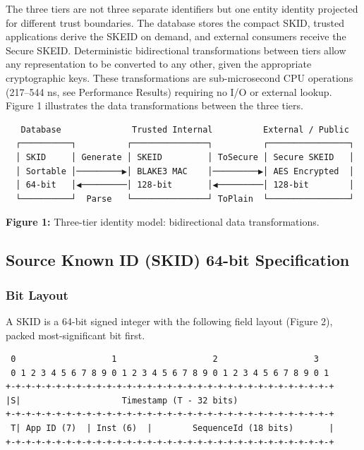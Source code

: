 \documentclass[fleqn,10pt]{wlpeerj}
\begin{document}
The three tiers are not three separate identifiers but one entity
identity projected for different trust boundaries. The database stores
the compact SKID, trusted applications derive the SKEID on demand, and
external consumers receive the Secure SKEID. Deterministic bidirectional
transformations between tiers allow any representation to be converted
to any other, given the appropriate cryptographic keys. These
transformations are sub-microsecond CPU operations (217--544 ns, see
Performance Results) requiring no I/O or external lookup. Figure 1
illustrates the data transformations between the three tiers.

\begin{verbatim}
   Database              Trusted Internal          External / Public
  ┌──────────┐          ┌───────────────┐          ┌────────────────┐
  │ SKID     │ Generate │ SKEID         │ ToSecure │ Secure SKEID   │
  │ Sortable │─────────▶│ BLAKE3 MAC    │─────────▶│ AES Encrypted  │
  │ 64-bit   │◀─────────│ 128-bit       │◀─────────│ 128-bit        │
  └──────────┘  Parse   └───────────────┘ ToPlain  └────────────────┘
\end{verbatim}

\textbf{Figure 1:} Three-tier identity model: bidirectional data
transformations.

\subsection{Source Known ID (SKID) 64-bit
Specification}\label{source-known-id-skid-64-bit-specification}

\subsubsection{Bit Layout}\label{bit-layout}

A SKID is a 64-bit signed integer with the following field layout
(Figure 2), packed most-significant bit first.

\begin{verbatim}
 0                   1                   2                   3
 0 1 2 3 4 5 6 7 8 9 0 1 2 3 4 5 6 7 8 9 0 1 2 3 4 5 6 7 8 9 0 1
+-+-+-+-+-+-+-+-+-+-+-+-+-+-+-+-+-+-+-+-+-+-+-+-+-+-+-+-+-+-+-+-+
|S|                    Timestamp (T - 32 bits)                   
+-+-+-+-+-+-+-+-+-+-+-+-+-+-+-+-+-+-+-+-+-+-+-+-+-+-+-+-+-+-+-+-+
 T| App ID (7)  | Inst (6)  |        SequenceId (18 bits)       |
+-+-+-+-+-+-+-+-+-+-+-+-+-+-+-+-+-+-+-+-+-+-+-+-+-+-+-+-+-+-+-+-+
\end{verbatim}
\end{document}
